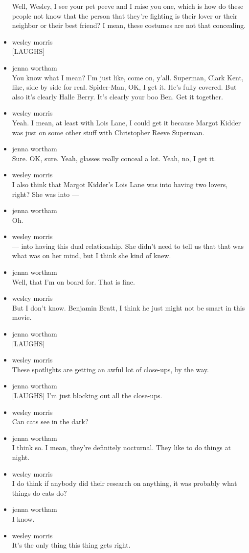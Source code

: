 \begin{itemize}
  Well, Wesley, I see your pet peeve and I raise you one, which is how
  do these people not know that the person that they're fighting is
  their lover or their neighbor or their best friend? I mean, these
  costumes are not that concealing.
\item
  wesley morris\\
  {[}LAUGHS{]}
\item
  jenna wortham\\
  You know what I mean? I'm just like, come on, y'all. Superman, Clark
  Kent, like, side by side for real. Spider-Man, OK, I get it. He's
  fully covered. But also it's clearly Halle Berry. It's clearly your
  boo Ben. Get it together.
\item
  wesley morris\\
  Yeah. I mean, at least with Lois Lane, I could get it because Margot
  Kidder was just on some other stuff with Christopher Reeve Superman.
\item
  jenna wortham\\
  Sure. OK, sure. Yeah, glasses really conceal a lot. Yeah, no, I get
  it.
\item
  wesley morris\\
  I also think that Margot Kidder's Lois Lane was into having two
  lovers, right? She was into ---
\item
  jenna wortham\\
  Oh.
\item
  wesley morris\\
  --- into having this dual relationship. She didn't need to tell us
  that that was what was on her mind, but I think she kind of knew.
\item
  jenna wortham\\
  Well, that I'm on board for. That is fine.
\item
  wesley morris\\
  But I don't know. Benjamin Bratt, I think he just might not be smart
  in this movie.
\item
  jenna wortham\\
  {[}LAUGHS{]}
\item
  wesley morris\\
  These spotlights are getting an awful lot of close-ups, by the way.
\item
  jenna wortham\\
  {[}LAUGHS{]} I'm just blocking out all the close-ups.
\item
  wesley morris\\
  Can cats see in the dark?
\item
  jenna wortham\\
  I think so. I mean, they're definitely nocturnal. They like to do
  things at night.
\item
  wesley morris\\
  I do think if anybody did their research on anything, it was probably
  what things do cats do?
\item
  jenna wortham\\
  I know.
\item
  wesley morris\\
  It's the only thing this thing gets right.


\end{itemize}
